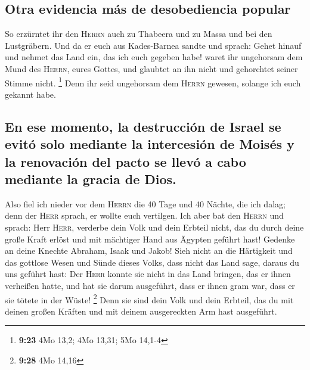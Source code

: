 \hypertarget{otra-evidencia-muxe1s-de-desobediencia-popular}{%
\subsection{Otra evidencia más de desobediencia
popular}\label{otra-evidencia-muxe1s-de-desobediencia-popular}}

 So erzürntet ihr den \textsc{Herrn} auch zu Thabeera und
zu Massa und bei den Lustgräbern.  Und da er euch aus
Kades-Barnea sandte und sprach: Gehet hinauf und nehmet das Land ein,
das ich euch gegeben habe! waret ihr ungehorsam dem Mund des
\textsc{Herrn}, eures Gottes, und glaubtet an ihn nicht und gehorchtet
seiner Stimme nicht. \footnote{\textbf{9:23} 4Mo 13,2; 4Mo 13,31; 5Mo
  14,1-4}  Denn ihr seid ungehorsam dem \textsc{Herrn}
gewesen, solange ich euch gekannt habe.

\hypertarget{en-ese-momento-la-destrucciuxf3n-de-israel-se-evituxf3-solo-mediante-la-intercesiuxf3n-de-moisuxe9s-y-la-renovaciuxf3n-del-pacto-se-llevuxf3-a-cabo-mediante-la-gracia-de-dios.}{%
\subsection{En ese momento, la destrucción de Israel se evitó solo
mediante la intercesión de Moisés y la renovación del pacto se llevó a
cabo mediante la gracia de
Dios.}\label{en-ese-momento-la-destrucciuxf3n-de-israel-se-evituxf3-solo-mediante-la-intercesiuxf3n-de-moisuxe9s-y-la-renovaciuxf3n-del-pacto-se-llevuxf3-a-cabo-mediante-la-gracia-de-dios.}}

 Also fiel ich nieder vor dem \textsc{Herrn} die 40 Tage
und 40 Nächte, die ich dalag; denn der \textsc{Herr} sprach, er wollte
euch vertilgen.  Ich aber bat den \textsc{Herrn} und
sprach: Herr \textsc{Herr}, verderbe dein Volk und dein Erbteil nicht,
das du durch deine große Kraft erlöst und mit mächtiger Hand aus Ägypten
geführt hast!  Gedenke an deine Knechte Abraham, Isaak
und Jakob! Sieh nicht an die Härtigkeit und das gottlose Wesen und Sünde
dieses Volks,  dass nicht das Land sage, daraus du uns
geführt hast: Der \textsc{Herr} konnte sie nicht in das Land bringen,
das er ihnen verheißen hatte, und hat sie darum ausgeführt, dass er
ihnen gram war, dass er sie tötete in der Wüste! \footnote{\textbf{9:28}
  4Mo 14,16}  Denn sie sind dein Volk und dein Erbteil,
das du mit deinen großen Kräften und mit deinem ausgereckten Arm hast
ausgeführt.

